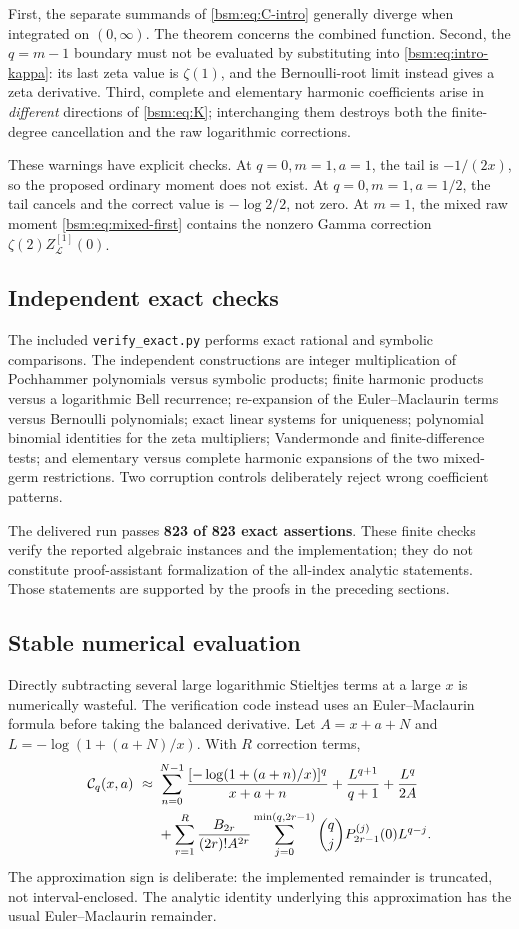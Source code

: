 \documentclass[11pt,letterpaper]{article}
\numberwithin{equation}{section}
\theoremstyle{definition}\newtheorem{definition}[theorem]{Definition}
\theoremstyle{remark}\newtheorem{remark}[theorem]{Remark}
\newcommand{\Ccal}{\mathcal C}
\newcommand{\Lcal}{\mathcal L}
\begin{document}
First, the separate summands of \eqref{bsm:eq:C-intro} generally diverge
when integrated on $(0,\infty)$. The theorem concerns the combined
function. Second, the $q=m-1$ boundary must not be evaluated by
substituting into \eqref{bsm:eq:intro-kappa}: its last zeta value is
$\zeta(1)$, and the Bernoulli-root limit instead gives a zeta derivative.
Third, complete and elementary harmonic coefficients arise in
\emph{different} directions of \eqref{bsm:eq:K}; interchanging them destroys
both the finite-degree cancellation and the raw logarithmic corrections.

These warnings have explicit checks. At $q=0,m=1,a=1$, the tail is
$-1/(2x)$, so the proposed ordinary moment does not exist. At
$q=0,m=1,a=1/2$, the tail cancels and the correct value is
$-\log2/2$, not zero. At $m=1$, the mixed raw moment
\eqref{bsm:eq:mixed-first} contains the nonzero Gamma correction
$\zeta(2)Z_{\Lcal}^{[1]}(0)$.

\subsection{Independent exact checks}
The included \texttt{verify\_exact.py} performs exact rational and
symbolic comparisons. The independent constructions are integer
multiplication of Pochhammer polynomials versus symbolic products;
finite harmonic products versus a logarithmic Bell recurrence;
re-expansion of the Euler--Maclaurin terms versus Bernoulli polynomials;
exact linear systems for uniqueness; polynomial binomial identities
for the zeta multipliers; Vandermonde and finite-difference tests;
and elementary versus complete harmonic expansions of the two
mixed-germ restrictions. Two corruption controls deliberately reject
wrong coefficient patterns.

The delivered run passes \textbf{823 of 823 exact assertions}. These
finite checks verify the reported algebraic instances and the
implementation; they do not constitute proof-assistant formalization
of the all-index analytic statements. Those statements are supported
by the proofs in the preceding sections.

\subsection{Stable numerical evaluation}
Directly subtracting several large logarithmic Stieltjes terms at a
large $x$ is numerically wasteful. The verification code instead
uses an Euler--Maclaurin formula before taking the balanced derivative.
Let $A=x+a+N$ and $L=-\log(1+(a+N)/x)$. With $R$ correction terms,
\begin{align}\label{bsm:eq:EM-evaluator}
 \Ccal_q(x,a)\ \approx\ &
 \sum_{n=0}^{N-1}\frac{[-\log(1+(a+n)/x)]^q}{x+a+n}
       +\frac{L^{q+1}}{q+1}+\frac{L^q}{2A}\notag\\
 &+\sum_{r=1}^{R}\frac{B_{2r}}{(2r)!A^{2r}}
       \sum_{j=0}^{\min(q,2r-1)}\binom qj
                  P_{2r-1}^{(j)}(0)L^{q-j}.
\end{align}
The approximation sign is deliberate: the implemented remainder is
truncated, not interval-enclosed. The analytic identity underlying
this approximation has the usual Euler--Maclaurin remainder.
\end{document}
